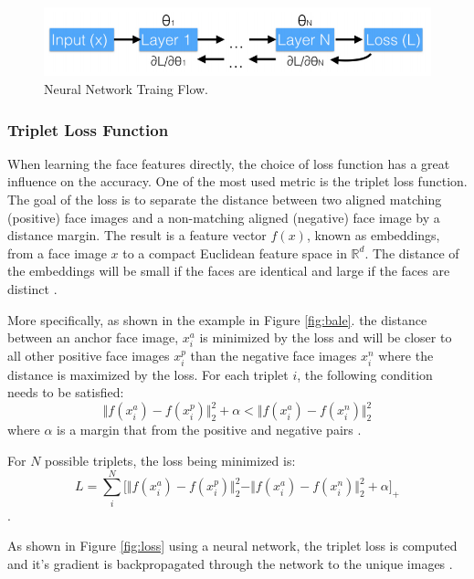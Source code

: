\documentclass[12pt,english]{article}
\begin{document}
\begin{figure}[!tbp]
 \centering
    \includegraphics[width=\columnwidth]{figures/neural_flow.png}
    \caption{Neural Network Traing Flow. \cite{amos}}
	\label{fig:nnflow}
\end{figure}

\subsubsection{Triplet Loss Function}

\quad
When learning the face features directly, the choice of loss function has a great influence on the accuracy. One of the most used metric is the triplet loss function. The goal of the loss is to separate the distance between two aligned matching (positive) face images and a non-matching aligned (negative) face image by a distance margin. The result is a feature vector $f(x)$, known as embeddings, from a face image $x$ to a compact Euclidean feature space in $ \mathbb{R}^{d}$. The distance of the embeddings will be small if the faces are identical and large if the faces are distinct \cite{schroff}.


More specifically, as shown in the example in Figure \ref{fig:bale}. the distance between an anchor face image, $x_{i}^{a}$ is minimized by the loss and will be closer to all other positive face images $x_{i}^{p}$ than the negative face images $x_{i}^{n}$ where the distance is maximized by the loss. For each triplet $i$, the following condition needs to be satisfied: $$\Vert f(x_{i}^{a}) - f(x_{i}^{p}) \Vert_{2}^{2} + \alpha < \Vert f(x_{i}^{a}) - f(x_{i}^{n}) \Vert_{2}^{2} $$
where $\alpha$ is a margin that from the positive and negative pairs \cite{trigueros}.

For $N$ possible triplets, the loss being minimized is: $$ L = \sum_{i}^{N} \Big[ \Vert f(x_{i}^{a}) - f(x_{i}^{p}) \Vert_{2}^{2} - \Vert f(x_{i}^{a}) - f(x_{i}^{n}) \Vert_{2}^{2} + \alpha\Big]_{+} $$ \cite{schroff}.

As shown in Figure \ref{fig:loss} using a neural network, the triplet loss is computed and it's gradient is backpropagated through the network to the unique images \cite{amos}.
\end{document}
